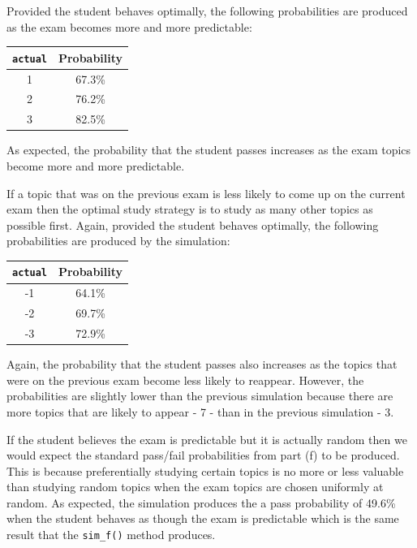 \documentclass[10pt]{article}
\begin{document}
Provided the student behaves optimally, the following probabilities are produced as the exam becomes more and more predictable:

\begin{center}
    \begin{tabular}{|c|c|}
        \hline
        \texttt{actual} & Probability \\ \hline
        1 & 67.3\% \\ \hline
        2 & 76.2\% \\ \hline
        3 & 82.5\% \\ \hline
    \end{tabular}
\end{center}

As expected, the probability that the student passes increases as the exam topics become more and more predictable.

If a topic that was on the previous exam is less likely to come up on the current exam then the optimal study strategy is to study as many other topics as possible first. Again, provided the student behaves optimally, the following probabilities are produced by the simulation:

\begin{center}
    \begin{tabular}{|c|c|}
        \hline
        \texttt{actual} & Probability \\ \hline
        -1 & 64.1\% \\ \hline
        -2 & 69.7\% \\ \hline
        -3 & 72.9\% \\ \hline
    \end{tabular}
\end{center}

Again, the probability that the student passes also increases as the topics that were on the previous exam become less likely to reappear. However, the probabilities are slightly lower than the previous simulation because there are more topics that are likely to appear - 7 - than in the previous simulation - 3.

If the student believes the exam is predictable but it is actually random then we would expect the standard pass/fail probabilities from part (f) to be produced. This is because preferentially studying certain topics is no more or less valuable than studying random topics when the exam topics are chosen uniformly at random. As expected, the simulation produces the a pass probability of 49.6\% when the student behaves as though the exam is predictable which is the same result that the \texttt{sim\_f()} method produces.
\end{document}
